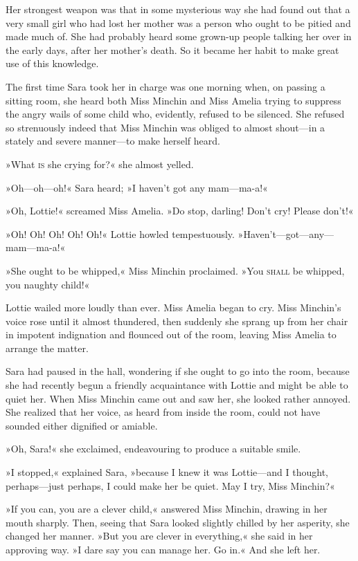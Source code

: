 Her strongest weapon was that in some mysterious way she had found out that a very small girl who had lost her mother was a person who ought to be pitied and made much of. She had probably heard some grown-up people talking her over in the early days, after her mother's death. So it became her habit to make great use of this knowledge.

The first time Sara took her in charge was one morning when, on passing a sitting room, she heard both Miss Minchin and Miss Amelia trying to suppress the angry wails of some child who, evidently, refused to be silenced. She refused so strenuously indeed that Miss Minchin was obliged to almost shout—in a stately and severe manner—to make herself heard.

»What \textsc{is} she crying for?« she almost yelled.

»Oh—oh—oh!« Sara heard; »I haven't got any mam—ma-a!«

»Oh, Lottie!« screamed Miss Amelia. »Do stop, darling! Don't cry! Please don't!«

»Oh! Oh! Oh! Oh! Oh!« Lottie howled tempestuously. »Haven't—got—any—mam—ma-a!«

»She ought to be whipped,« Miss Minchin proclaimed. »You \textsc{shall} be whipped, you naughty child!«

Lottie wailed more loudly than ever. Miss Amelia began to cry. Miss Minchin's voice rose until it almost thundered, then suddenly she sprang up from her chair in impotent indignation and flounced out of the room, leaving Miss Amelia to arrange the matter.

Sara had paused in the hall, wondering if she ought to go into the room, because she had recently begun a friendly acquaintance with Lottie and might be able to quiet her. When Miss Minchin came out and saw her, she looked rather annoyed. She realized that her voice, as heard from inside the room, could not have sounded either dignified or amiable.

»Oh, Sara!« she exclaimed, endeavouring to produce a suitable smile.

»I stopped,« explained Sara, »because I knew it was Lottie—and I thought, perhaps—just perhaps, I could make her be quiet. May I try, Miss Minchin?«

»If you can, you are a clever child,« answered Miss Minchin, drawing in her mouth sharply. Then, seeing that Sara looked slightly chilled by her asperity, she changed her manner. »But you are clever in everything,« she said in her approving way. »I dare say you can manage her. Go in.« And she left her.

